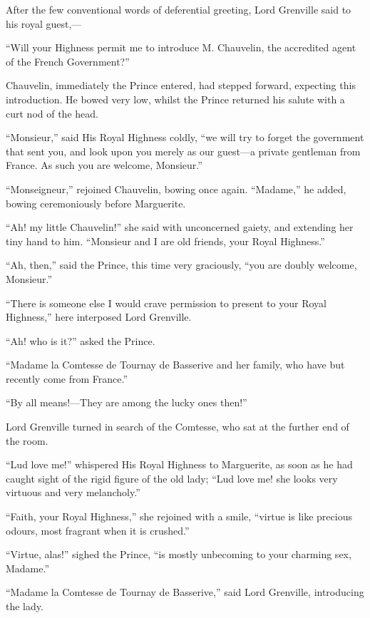 \documentclass[paper=5.5in:8.5in,BCOR=7mm,twoside,DIV=calc,12pt,usegeometry,chapterprefix,endperiod,headings=big]{scrbook}
\begin{document}
After the few conventional words of deferential greeting, Lord Grenville said to his royal guest,---

\enquote{Will your Highness permit me to introduce M. Chauvelin, the accredited agent of the French Government?}

Chauvelin, immediately the Prince entered, had stepped forward, expecting this introduction. He bowed very low, whilst the Prince returned his salute with a curt nod of the head.

\enquote{Monsieur,} said His Royal Highness coldly, \enquote{we will try to forget the government that sent you, and look upon you merely as our guest---a private gentleman from France. As such you are welcome, Monsieur.}

\enquote{Monseigneur,} rejoined Chauvelin, bowing once again. \enquote{Madame,} he added, bowing ceremoniously before Marguerite.

\enquote{Ah! my little Chauvelin!} she said with unconcerned gaiety, and extending her tiny hand to him. \enquote{Monsieur and I are old friends, your Royal Highness.}

\enquote{Ah, then,} said the Prince, this time very graciously, \enquote{you are doubly welcome, Monsieur.}

\enquote{There is someone else I would crave permission to present to your Royal Highness,} here interposed Lord Grenville.

\enquote{Ah! who is it?} asked the Prince.

\enquote{Madame la Comtesse de Tournay de Basserive and her family, who have but recently come from France.}

\enquote{By all means!---They are among the lucky ones then!}

Lord Grenville turned in search of the Comtesse, who sat at the further end of the room.

\enquote{Lud love me!} whispered His Royal Highness to Marguerite, as soon as he had caught sight of the rigid figure of the old lady; \enquote{Lud love me! she looks very virtuous and very melancholy.}

\enquote{Faith, your Royal Highness,} she rejoined with a smile, \enquote{virtue is like precious odours, most fragrant when it is crushed.}

\enquote{Virtue, alas!} sighed the Prince, \enquote{is mostly unbecoming to your charming sex, Madame.}

\enquote{Madame la Comtesse de Tournay de Basserive,} said Lord Grenville, introducing the lady.
\end{document}
